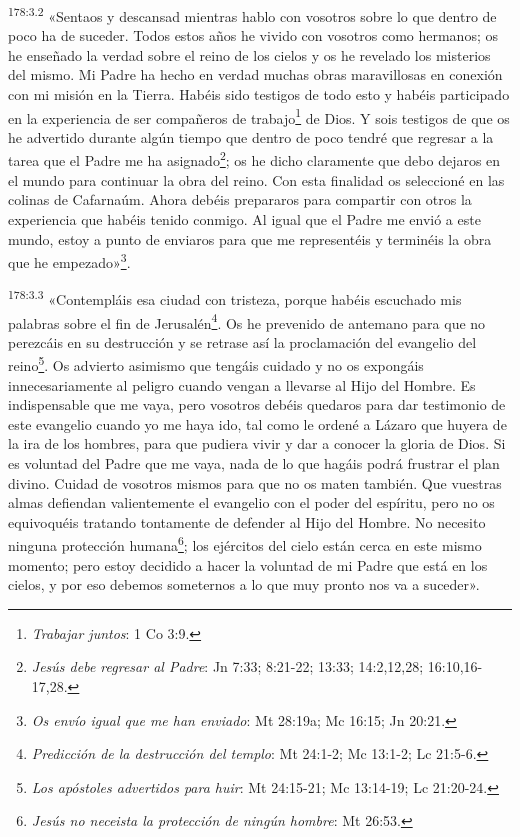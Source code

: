 \par 
\textsuperscript{178:3.2} «Sentaos y descansad mientras hablo con vosotros sobre lo que dentro de poco ha de suceder. Todos estos años he vivido con vosotros como hermanos; os he enseñado la verdad sobre el reino de los cielos y os he revelado los misterios del mismo. Mi Padre ha hecho en verdad muchas obras maravillosas en conexión con mi misión en la Tierra. Habéis sido testigos de todo esto y habéis participado en la experiencia de ser compañeros de trabajo\footnote{\textit{Trabajar juntos}: 1 Co 3:9.} de Dios. Y sois testigos de que os he advertido durante algún tiempo que dentro de poco tendré que regresar a la tarea que el Padre me ha asignado\footnote{\textit{Jesús debe regresar al Padre}: Jn 7:33; 8:21-22; 13:33; 14:2,12,28; 16:10,16-17,28.}; os he dicho claramente que debo dejaros en el mundo para continuar la obra del reino. Con esta finalidad os seleccioné en las colinas de Cafarnaúm. Ahora debéis prepararos para compartir con otros la experiencia que habéis tenido conmigo. Al igual que el Padre me envió a este mundo, estoy a punto de enviaros para que me representéis y terminéis la obra que he empezado»\footnote{\textit{Os envío igual que me han enviado}: Mt 28:19a; Mc 16:15; Jn 20:21.}.

\par 
\textsuperscript{178:3.3} «Contempláis esa ciudad con tristeza, porque habéis escuchado mis palabras sobre el fin de Jerusalén\footnote{\textit{Predicción de la destrucción del templo}: Mt 24:1-2; Mc 13:1-2; Lc 21:5-6.}. Os he prevenido de antemano para que no perezcáis en su destrucción y se retrase así la proclamación del evangelio del reino\footnote{\textit{Los apóstoles advertidos para huir}: Mt 24:15-21; Mc 13:14-19; Lc 21:20-24.}. Os advierto asimismo que tengáis cuidado y no os expongáis innecesariamente al peligro cuando vengan a llevarse al Hijo del Hombre. Es indispensable que me vaya, pero vosotros debéis quedaros para dar testimonio de este evangelio cuando yo me haya ido, tal como le ordené a Lázaro que huyera de la ira de los hombres, para que pudiera vivir y dar a conocer la gloria de Dios. Si es voluntad del Padre que me vaya, nada de lo que hagáis podrá frustrar el plan divino. Cuidad de vosotros mismos para que no os maten también. Que vuestras almas defiendan valientemente el evangelio con el poder del espíritu, pero no os equivoquéis tratando tontamente de defender al Hijo del Hombre. No necesito ninguna protección humana\footnote{\textit{Jesús no neceista la protección de ningún hombre}: Mt 26:53.}; los ejércitos del cielo están cerca en este mismo momento; pero estoy decidido a hacer la voluntad de mi Padre que está en los cielos, y por eso debemos someternos a lo que muy pronto nos va a suceder».

